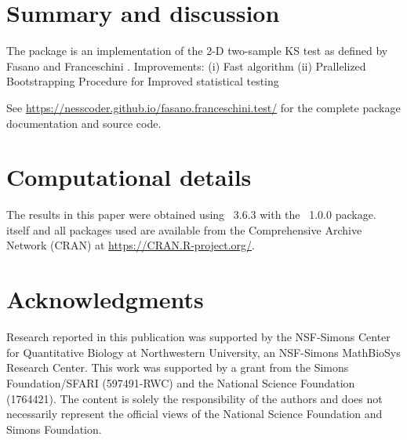 \documentclass[codesnippet]{jss}
\begin{document}

\section{Summary and discussion} \label{sec:summary}

The  package is an  implementation of the 2-D two-sample KS test as defined by Fasano and Franceschini \citep{Fasano1987}.
Improvements:
  (i) Fast algorithm
  (ii) Prallelized Bootstrapping Procedure for Improved statistical testing

  See \url{https://nesscoder.github.io/fasano.franceschini.test/} for the complete package documentation and source code.



\section*{Computational details}


The results in this paper were obtained using
~3.6.3 with the
~1.0.0 package.  itself
and all packages used are available from the Comprehensive
 Archive Network (CRAN) at
\url{https://CRAN.R-project.org/}.


\section*{Acknowledgments}

Research reported in this publication was supported by the NSF-Simons Center for Quantitative Biology at Northwestern University, an NSF-Simons MathBioSys Research Center. This work was supported by a grant from the Simons Foundation/SFARI (597491-RWC) and the National Science Foundation (1764421). The content is solely the responsibility of the authors and does not necessarily represent the official views of the National Science Foundation and Simons Foundation.
\end{document}
